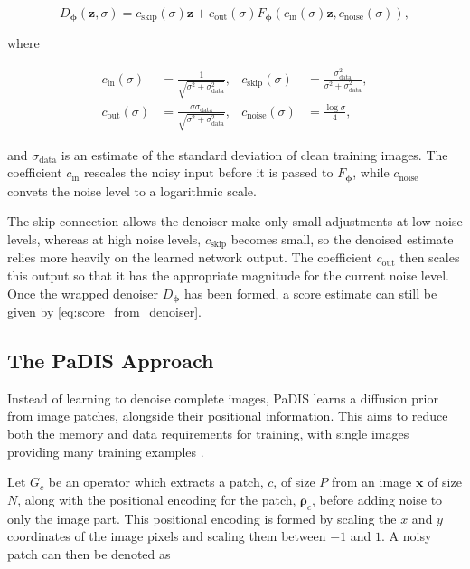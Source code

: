 \begin{equation} D_{\boldsymbol{\phi}}(\mathbf{z},\sigma) =
c_{\mathrm{skip}}(\sigma)\mathbf{z} + c_{\mathrm{out}}(\sigma)
F_{\boldsymbol{\phi}} \left( c_{\mathrm{in}}(\sigma)\mathbf{z},
c_{\mathrm{noise}}(\sigma) \right), \label{eq:edm_preconditioned_denoiser}
\end{equation}

where

\begin{align} c_{\mathrm{in}}(\sigma) &=
\frac{1}{\sqrt{\sigma^2+\sigma_{\mathrm{data}}^2}}, & c_{\mathrm{skip}}(\sigma)
&= \frac{\sigma_{\mathrm{data}}^2}{\sigma^2+\sigma_{\mathrm{data}}^2}, \\
c_{\mathrm{out}}(\sigma) &=
\frac{\sigma\sigma_{\mathrm{data}}}{\sqrt{\sigma^2+\sigma_{\mathrm{data}}^2}}, &
c_{\mathrm{noise}}(\sigma) &= \frac{\log \sigma}{4}, \label{eq:
edm_preconditioning_coefficients} \end{align}

and $\sigma_{\mathrm{data}}$ is an estimate of the standard deviation of
clean training images. The coefficient $c_{\mathrm{in}}$ rescales the noisy
input before it is passed to $F_{\boldsymbol{\phi}}$, while $c_{\mathrm{noise}}$
convets the noise level to a logarithmic scale. 

The skip connection allows the denoiser make only small adjustments at low noise levels, whereas at high noise levels, $c_{\mathrm{skip}}$ becomes small, so the denoised estimate relies more heavily on the learned network output. The coefficient $c_{\mathrm{out}}$ then scales this output so that it has the appropriate magnitude for the current noise level. Once the wrapped denoiser $D_{\boldsymbol{\phi}}$ has been formed, a score estimate can still be given by \autoref{eq:score_from_denoiser}.

\subsection{The PaDIS Approach}
\label{subsec:padis_approach}

Instead of learning to denoise complete images, PaDIS learns a diffusion prior from image patches, alongside their positional information. This aims to reduce both the memory and data requirements for training, with single images providing many training examples \cite{PaDIS}.

Let $G_c$ be an operator which extracts a patch, $c$, of size $P$ from an image $\mathbf{x}$ of size $N$, along with the positional encoding for the patch, $\boldsymbol{\rho}_c$, before adding noise to only the image part. This positional encoding is formed by scaling the $x$ and $y$ coordinates of the image pixels and scaling them between $-1$ and $1$. A noisy patch can then be denoted as


